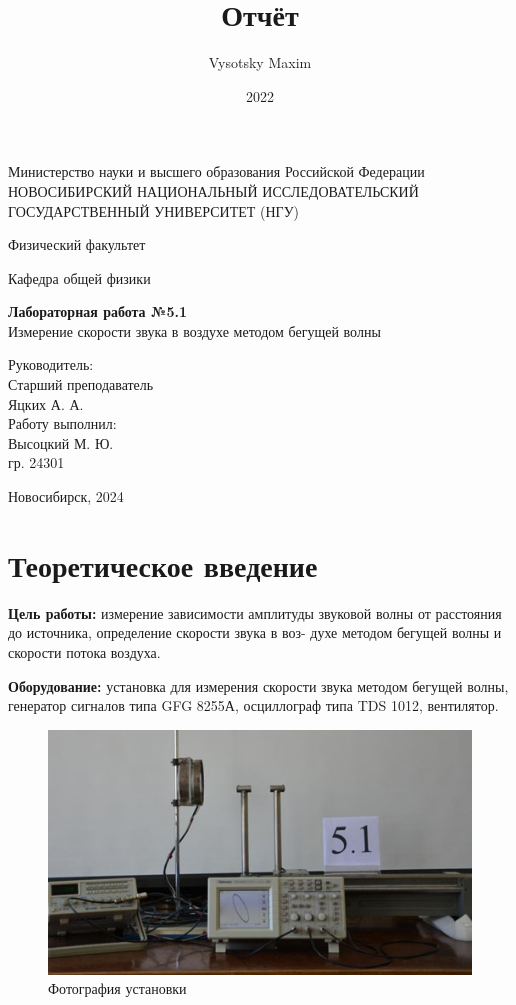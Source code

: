 \documentclass[a4paper,12pt]{article}
\author{Vysotsky Maxim}
\title{Отчёт}
\date{2022}
\begin{document}
	\begin{titlepage}
		\begin{center}
			{Министерство науки и высшего образования Российской Федерации
				НОВОСИБИРСКИЙ НАЦИОНАЛЬНЫЙ ИССЛЕДОВАТЕЛЬСКИЙ
				ГОСУДАРСТВЕННЫЙ УНИВЕРСИТЕТ (НГУ)}
		\end{center}
		\begin{center}
			{Физический факультет}
		\end{center}
		\begin{center}
			{Кафедра общей физики}
		\end{center}
		
		
		\vspace{7cm}
		{
			\begin{center}
				{\bf Лабораторная работа №5.1}\\
				Измерение скорости звука в воздухе методом бегущей волны
			\end{center}
		}
		\vspace{2cm}
		\begin{flushright}
			{Руководитель:\\ Старший преподаватель\\
				Яцких А. А.\\
				Работу выполнил:\\
				Высоцкий М. Ю.\\
				\vspace{0.2cm}
				гр. 24301}
		\end{flushright}
		\vspace{3cm}
		\begin{center}
			Новосибирск, 2024
		\end{center}
	\end{titlepage}

\section{Теоретическое введение}
\textbf{Цель работы:} измерение зависимости амплитуды звуковой
волны от расстояния до источника, определение скорости звука в воз-
духе методом бегущей волны и скорости потока воздуха.

\textbf{Оборудование:} установка для измерения скорости звука методом
бегущей волны, генератор сигналов типа GFG 8255А, осциллограф типа TDS 1012, вентилятор.

\begin{figure}[ht!]
    \centering
    \includegraphics[scale=2.3]{ust.jpg}
    \caption{Фотография установки}
\end{figure}
\end{document}
